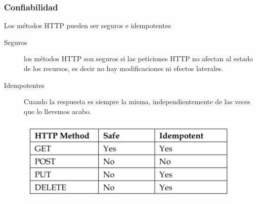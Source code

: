 \documentclass[4paper]{article}
\begin{document}
\newpage

\subsubsection{Confiabilidad}
Los métodos HTTP pueden ser seguros e idempotentes
\begin{description}
\item[Seguros] los métodos HTTP son seguros si las peticiones HTTP no afectan al estado de los recursos, es decir no hay modificaciones ni efectos laterales.
\item[Idempotentes] Cuando la respuesta es siempre la misma, independientemente de las veces que lo llevemos acabo.
\end{description}
\begin{figure}[H]
\includegraphics[scale=0.5]{../imagenes/rest1.png}
\end{figure}
\end{document}
